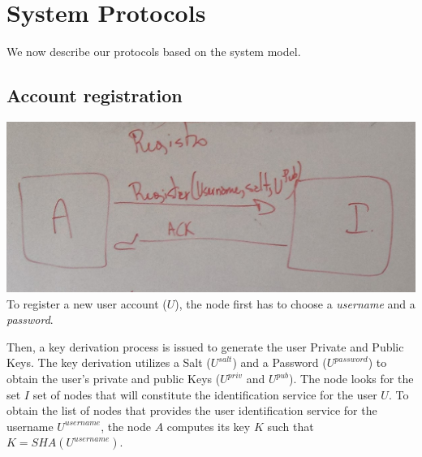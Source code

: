 \section{System Protocols}
We now describe our protocols based on the system model. 

\subsection{Account registration}
\includegraphics[width=14cm]{../img/registration_protocol_mockup.png}\\

To register a new user account ($U$), the node first
has to choose a \textit{username} and a \textit{password}.
% 
% 

Then, a key derivation process is issued to generate the user Private and
Public Keys. The
key derivation utilizes a Salt ($U^{salt}$) and a Password ($U^{password}$) to
obtain the user's private and public Keys
($U^{priv}$ and $U^{pub}$).
The node  looks for the set $I$ set of nodes that will constitute the
identification service for the user $U$. To obtain the list of nodes that provides the user identification service for
the username $U^{username}$, the node $A$ computes its key $K$ such that $K =
SHA(U^{username})$. 

